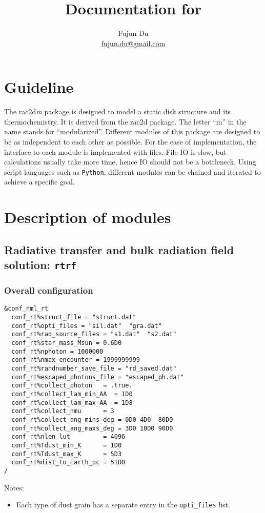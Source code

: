 \documentclass{article}
\title{Documentation for \ractdm}
\author{Fujun Du\\
\url{fujun.du@gmail.com}}
\newcommand{\cds}[1]{\texttt{#1}}
\newcommand{\python}{\texttt{Python}}
\newcommand{\ractdm}{\textsf{rac2d}\textit{m}}
\newcommand{\ractd}{\textsf{rac2d}}
\newcommand{\radtran}{\texttt{rtrf}}
\begin{document}
\maketitle
\tableofcontents

\section{Guideline}

The \ractdm{} package is designed to model a static disk structure and its thermochemistry.  It is derived from the \ractd{} package.  The letter ``m'' in the name stands for ``modularized''.  Different modules of this package are designed to be as independent to each other as possible.
For the ease of implementation, the interface to each module is implemented with files.  File IO is slow, but calculations usually take more time, hence IO should not be a bottleneck.
Using script languages such as \python, different modules can be chained and iterated to achieve a specific goal.

\section{Description of modules}

\subsection{Radiative transfer and bulk radiation field solution: \radtran}

\subsubsection{Overall configuration}

\begin{lstlisting}
&conf_nml_rt
  conf_rt%struct_file = "struct.dat"
  conf_rt%opti_files = "sil.dat"  "gra.dat"
  conf_rt%rad_source_files = "s1.dat"  "s2.dat"
  conf_rt%star_mass_Msun = 0.6D0
  conf_rt%nphoton = 1000000
  conf_rt%nmax_encounter = 1999999999
  conf_rt%randnumber_save_file = "rd_saved.dat"
  conf_rt%escaped_photons_file = "escaped_ph.dat"
  conf_rt%collect_photon   = .true.
  conf_rt%collect_lam_min_AA  = 1D0
  conf_rt%collect_lam_max_AA  = 1D8
  conf_rt%collect_nmu      = 3
  conf_rt%collect_ang_mins_deg = 0D0 4D0  80D0
  conf_rt%collect_ang_maxs_deg = 3D0 10D0 90D0
  conf_rt%nlen_lut         = 4096
  conf_rt%Tdust_min_K      = 1D0
  conf_rt%Tdust_max_K      = 5D3
  conf_rt%dist_to_Earth_pc = 51D0
/
\end{lstlisting}
Notes:
\begin{itemize}
  \item Each type of dust grain has a separate entry in the \cds{opti\_files} list.
\end{itemize}  
\end{document}
